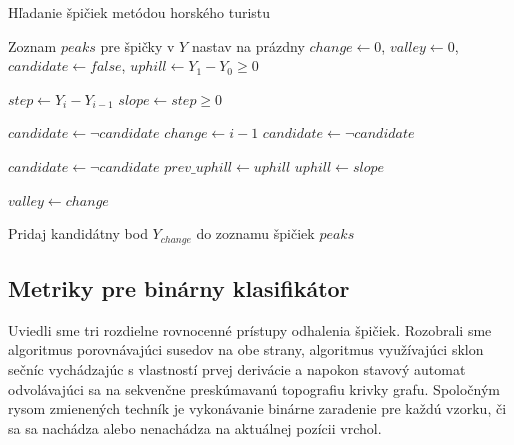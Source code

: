 \begin{algorithm}[h]
\caption{Hľadanie špičiek metódou horského turistu}
\begin{algorithmic}[1]
\State Zoznam $peaks$ pre špičky v $Y$ nastav na prázdny
\State $change \gets 0$, $valley \gets 0$, $candidate \gets false$, $uphill \gets Y_1 - Y_0 \geq 0$

	\State $step \gets Y_i - Y_{i-1}$
    \State $slope \gets step \geq 0$

    	\State $candidate \gets \neg candidate$   
        \State $change \gets i - 1$
       	\State $candidate \gets \neg candidate$  
    \EndIf
    

        \State $candidate \gets \neg candidate$
        \State $prev\_uphill \gets uphill$      
        \State $uphill \gets slope$

			\State $valley \gets change$   

            		
				\State Pridaj kandidátny bod $Y_{change}$ do zoznamu špičiek $peaks$
            \EndIf
        \EndIf
\EndFor
\end{algorithmic}
\label{algo:mountain-hiker}
\end{algorithm}

\subsection{Metriky pre binárny klasifikátor}
Uviedli sme tri rozdielne rovnocenné prístupy odhalenia špičiek. Rozobrali sme algoritmus porovnávajúci susedov na obe strany,
algoritmus využívajúci sklon sečníc vychádzajúc s vlastností prvej derivácie a napokon
stavový automat odvolávajúci sa na sekvenčne preskúmavanú topografiu krivky grafu. Spoločným rysom zmienených techník
je vykonávanie binárne zaradenie pre každú vzorku, či sa sa nachádza alebo nenachádza na aktuálnej pozícii vrchol.

